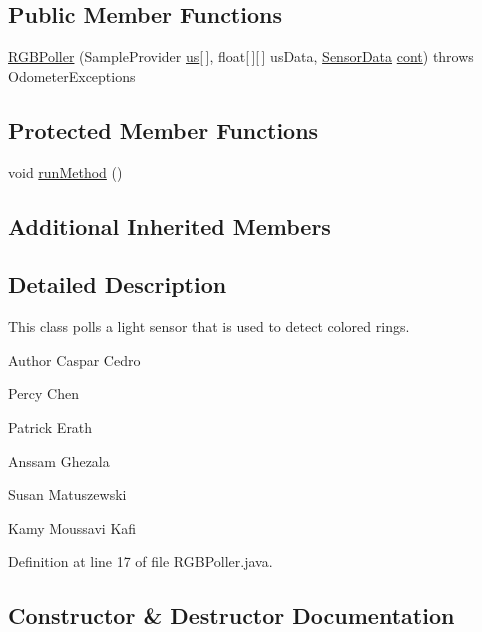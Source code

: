 \subsection*{Public Member Functions}
\begin{DoxyCompactItemize}
\item 
\hyperlink{classca_1_1mcgill_1_1ecse211_1_1threads_1_1_r_g_b_poller_a7e23e2fe527b2ecbf4ddc8f988dd70a5}{R\+G\+B\+Poller} (Sample\+Provider \hyperlink{classca_1_1mcgill_1_1ecse211_1_1threads_1_1_light_poller_ab6a9cb770bbf71f586697633db1475ff}{us}\mbox{[}$\,$\mbox{]}, float\mbox{[}$\,$\mbox{]}\mbox{[}$\,$\mbox{]} us\+Data, \hyperlink{classca_1_1mcgill_1_1ecse211_1_1threads_1_1_sensor_data}{Sensor\+Data} \hyperlink{classca_1_1mcgill_1_1ecse211_1_1threads_1_1_light_poller_ab6a9050ced4f6940add4735c8872194a}{cont})  throws Odometer\+Exceptions 
\end{DoxyCompactItemize}
\subsection*{Protected Member Functions}
\begin{DoxyCompactItemize}
\item 
void \hyperlink{classca_1_1mcgill_1_1ecse211_1_1threads_1_1_r_g_b_poller_a96db4561c87136de5098497fe30356fe}{run\+Method} ()
\end{DoxyCompactItemize}
\subsection*{Additional Inherited Members}


\subsection{Detailed Description}
This class polls a light sensor that is used to detect colored rings.

\begin{DoxyAuthor}{Author}
Caspar Cedro 

Percy Chen 

Patrick Erath 

Anssam Ghezala 

Susan Matuszewski 

Kamy Moussavi Kafi 
\end{DoxyAuthor}


Definition at line 17 of file R\+G\+B\+Poller.\+java.



\subsection{Constructor \& Destructor Documentation}
\mbox{\label{classca_1_1mcgill_1_1ecse211_1_1threads_1_1_r_g_b_poller_a7e23e2fe527b2ecbf4ddc8f988dd70a5}} 
